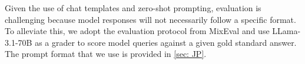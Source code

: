 Given the use of chat templates and zero-shot prompting, evaluation is challenging because model responses will not necessarily follow a specific format. To alleviate this, we adopt the evaluation protocol from MixEval \citep{ni2024mixeval} and use LLama-3.1-70B as a grader to score model queries against a given gold standard answer. The prompt format that we use is provided in \ref{sec: JP}.





